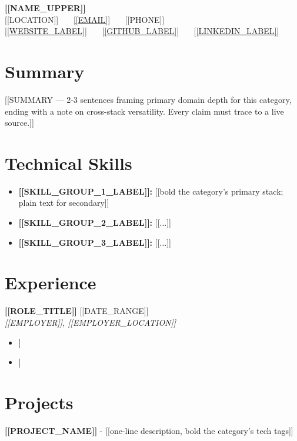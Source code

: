 \documentclass[10pt,a4paper]{article}
\begin{document}
\begin{center}
  {\fontsize{14}{16.5}\selectfont \textbf{\color{primary} [[NAME\_UPPER]]}}\\[1pt]
  \small
  [[LOCATION]] \ \textbar\ \
  \href{mailto:[[EMAIL]]}{[[EMAIL]]} \ \textbar\ \
  [[PHONE]]\\[0.5pt]
  \href{[[WEBSITE]]}{[[WEBSITE\_LABEL]]} \ \textbar\ \
  \href{[[GITHUB]]}{[[GITHUB\_LABEL]]} \ \textbar\ \
  \href{[[LINKEDIN]]}{[[LINKEDIN\_LABEL]]}
\end{center}

\vspace{-4pt}

\section*{Summary}
[[SUMMARY — 2-3 sentences framing primary domain depth for this category, ending with a note on
cross-stack versatility. Every claim must trace to a live source.]]

\section*{Technical Skills}
\begin{itemize}
  \item \textbf{[[SKILL\_GROUP\_1\_LABEL]]:} [[bold the category's primary stack; plain text for secondary]]
  \item \textbf{[[SKILL\_GROUP\_2\_LABEL]]:} [[...]]
  \item \textbf{[[SKILL\_GROUP\_3\_LABEL]]:} [[...]]
\end{itemize}

\section*{Experience}
\textbf{[[ROLE\_TITLE]]} \hfill [[DATE\_RANGE]] \\
\textit{[[EMPLOYER]], [[EMPLOYER\_LOCATION]]}
\begin{itemize}
  \item [[bullet — bold the category-relevant tech/outcome]]
  \item [[bullet]]
\end{itemize}

\section*{Projects}
\textbf{[[PROJECT\_NAME]]} - [[one-line description, bold the category's tech tags]]
\end{document}
